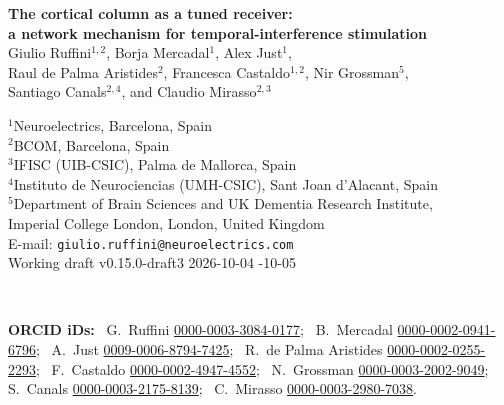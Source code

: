 \documentclass[11pt,a4paper]{article}
\newif\ifjne
\newcommand{\paperver}{0.15.0-draft3} %
\providecommand{\DIFaddtex}[1]{{\protect\color{blue} \sf #1}} %
\providecommand{\DIFdeltex}[1]{{\protect\color{red} \scriptsize #1}} %
\providecommand{\DIFaddbegin}{} %
\providecommand{\DIFaddend}{} %
\providecommand{\DIFdelbegin}{} %
\providecommand{\DIFdelend}{} %
\providecommand{\DIFadd}[1]{\texorpdfstring{\DIFaddtex{#1}}{#1}} %
\providecommand{\DIFdel}[1]{\texorpdfstring{\DIFdeltex{#1}}{}} %
\begin{document}
\ifjne
\begin{center}
{\LARGE\bfseries The cortical column as a tuned receiver:\\[4pt]
a network mechanism for temporal-interference stimulation}\\[16pt]
{\large Giulio Ruffini$^{1,2}$, Borja Mercadal$^{1}$, Alex Just$^{1}$,\\[2pt]
Raul de Palma Aristides$^{2}$, Francesca Castaldo$^{1,2}$, Nir Grossman$^{5}$,\\[2pt]
Santiago Canals$^{2,4}$, and Claudio Mirasso$^{2,3}$}\\[12pt]
\begin{minipage}{0.86\textwidth}\centering\small
$^{1}$Neuroelectrics, Barcelona, Spain\\
$^{2}$BCOM, Barcelona, Spain\\
$^{3}$IFISC (UIB-CSIC), Palma de Mallorca, Spain\\
$^{4}$Instituto de Neurociencias (UMH-CSIC), Sant Joan d'Alacant, Spain\\
$^{5}$Department of Brain Sciences and UK Dementia Research Institute,\\
Imperial College London, London, United Kingdom\\[6pt]
E-mail: \texttt{giulio.ruffini@neuroelectrics.com}\\[4pt]
Working draft v\paperver\quad \DIFdelbegin \DIFdel{2026-10-04
}\DIFdelend \DIFaddbegin \DIFadd{2026-10-05
}\DIFaddend \end{minipage}\\[8pt]
\begin{minipage}{0.86\textwidth}\centering\footnotesize\color{negray}
\textbf{ORCID iDs:}\ %
G.~Ruffini \href{https://orcid.org/0000-0003-3084-0177}{0000-0003-3084-0177};\ %
B.~Mercadal \href{https://orcid.org/0000-0002-0941-6796}{0000-0002-0941-6796};\ %
A.~Just \href{https://orcid.org/0009-0006-8794-7425}{0009-0006-8794-7425};\ %
R.~de Palma Aristides \href{https://orcid.org/0000-0002-0255-2293}{0000-0002-0255-2293};\ %
F.~Castaldo \href{https://orcid.org/0000-0002-4947-4552}{0000-0002-4947-4552};\ %
N.~Grossman \href{https://orcid.org/0000-0003-2002-9049}{0000-0003-2002-9049};\ %
S.~Canals \href{https://orcid.org/0000-0003-2175-8139}{0000-0003-2175-8139};\ %
C.~Mirasso \href{https://orcid.org/0000-0003-2980-7038}{0000-0003-2980-7038}.
\end{minipage}
\end{center}
\end{document}
